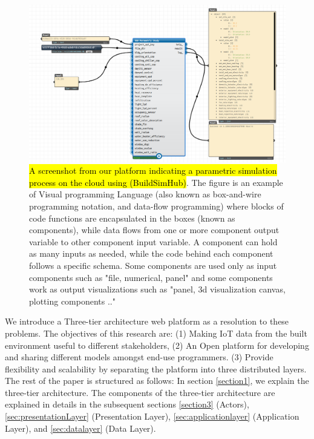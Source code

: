 \documentclass{scsSimAUDPaperFormat}
\begin{document}
\begin{figure}
\centering
\includegraphics[width=0.9\columnwidth]{imgs/vpl_example.png}
\caption{\hl{A screenshot from our platform indicating a parametric simulation process on the cloud using (BuildSimHub)}. The figure is an example of Visual programming Language (also known as box-and-wire programming notation, and data-flow programming) where blocks of code functions are encapsulated in the boxes (known as components), while data flows from one or more component output variable to other component input variable. A component can hold as many inputs as needed, while the code behind each component follows a specific schema. Some components are used only as input components such as "file, numerical, panel" and some components work as output visualizations such as "panel, 3d visualization canvas, plotting components .."}
\label{fig:vpl_example}
\end{figure}
We introduce a Three-tier architecture web platform as a resolution to these problems. The objectives of this research are: (1) Making IoT data from the built environment useful to different stakeholders, (2) An Open platform for developing and sharing different models amongst end-use programmers. (3) Provide flexibility and scalability by separating the platform into three distributed layers. The rest of the paper is structured as follows: In section \ref{section1}, we explain the three-tier architecture. The components of the three-tier architecture are explained in details in the subsequent sections \ref{section3} (Actors), \ref{sec:presentationLayer} (Presentation Layer), \ref{sec:applicationlayer} (Application Layer), and \ref{sec:datalayer} (Data Layer).
\end{document}
